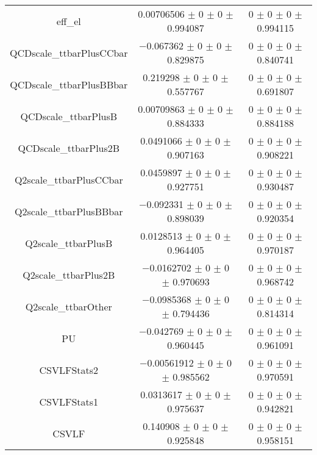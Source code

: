\begin{table}
\begin{tabular}{ccc}
eff\_el 	& \num{0.00706506} $\pm$ \num{0} $\pm$ \num{0} $\pm$ \num{0.994087} 	& \num{0} $\pm$ \num{0} $\pm$ \num{0} $\pm$ \num{0.994115}\\
QCDscale\_ttbarPlusCCbar 	& \num{-0.067362} $\pm$ \num{0} $\pm$ \num{0} $\pm$ \num{0.829875} 	& \num{0} $\pm$ \num{0} $\pm$ \num{0} $\pm$ \num{0.840741}\\
QCDscale\_ttbarPlusBBbar 	& \num{0.219298} $\pm$ \num{0} $\pm$ \num{0} $\pm$ \num{0.557767} 	& \num{0} $\pm$ \num{0} $\pm$ \num{0} $\pm$ \num{0.691807}\\
QCDscale\_ttbarPlusB 	& \num{0.00709863} $\pm$ \num{0} $\pm$ \num{0} $\pm$ \num{0.884333} 	& \num{0} $\pm$ \num{0} $\pm$ \num{0} $\pm$ \num{0.884188}\\
QCDscale\_ttbarPlus2B 	& \num{0.0491066} $\pm$ \num{0} $\pm$ \num{0} $\pm$ \num{0.907163} 	& \num{0} $\pm$ \num{0} $\pm$ \num{0} $\pm$ \num{0.908221}\\
Q2scale\_ttbarPlusCCbar 	& \num{0.0459897} $\pm$ \num{0} $\pm$ \num{0} $\pm$ \num{0.927751} 	& \num{0} $\pm$ \num{0} $\pm$ \num{0} $\pm$ \num{0.930487}\\
Q2scale\_ttbarPlusBBbar 	& \num{-0.092331} $\pm$ \num{0} $\pm$ \num{0} $\pm$ \num{0.898039} 	& \num{0} $\pm$ \num{0} $\pm$ \num{0} $\pm$ \num{0.920354}\\
Q2scale\_ttbarPlusB 	& \num{0.0128513} $\pm$ \num{0} $\pm$ \num{0} $\pm$ \num{0.964405} 	& \num{0} $\pm$ \num{0} $\pm$ \num{0} $\pm$ \num{0.970187}\\
Q2scale\_ttbarPlus2B 	& \num{-0.0162702} $\pm$ \num{0} $\pm$ \num{0} $\pm$ \num{0.970693} 	& \num{0} $\pm$ \num{0} $\pm$ \num{0} $\pm$ \num{0.968742}\\
Q2scale\_ttbarOther 	& \num{-0.0985368} $\pm$ \num{0} $\pm$ \num{0} $\pm$ \num{0.794436} 	& \num{0} $\pm$ \num{0} $\pm$ \num{0} $\pm$ \num{0.814314}\\
PU 	& \num{-0.042769} $\pm$ \num{0} $\pm$ \num{0} $\pm$ \num{0.960445} 	& \num{0} $\pm$ \num{0} $\pm$ \num{0} $\pm$ \num{0.961091}\\
CSVLFStats2 	& \num{-0.00561912} $\pm$ \num{0} $\pm$ \num{0} $\pm$ \num{0.985562} 	& \num{0} $\pm$ \num{0} $\pm$ \num{0} $\pm$ \num{0.970591}\\
CSVLFStats1 	& \num{0.0313617} $\pm$ \num{0} $\pm$ \num{0} $\pm$ \num{0.975637} 	& \num{0} $\pm$ \num{0} $\pm$ \num{0} $\pm$ \num{0.942821}\\
CSVLF 	& \num{0.140908} $\pm$ \num{0} $\pm$ \num{0} $\pm$ \num{0.925848} 	& \num{0} $\pm$ \num{0} $\pm$ \num{0} $\pm$ \num{0.958151}\\

\end{tabular}
\end{table}
